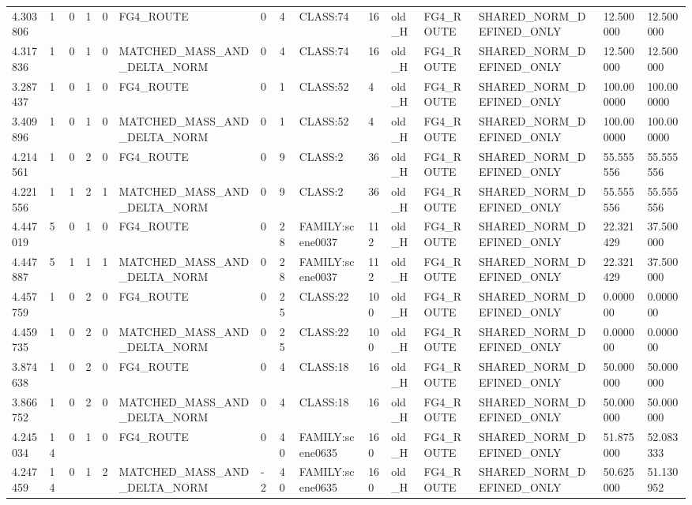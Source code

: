 \begin{tabular}{lllllllllllllll}
4.303806 & 1 & 0 & 1 & 0 & FG4\_ROUTE & 0 & 4 & CLASS:74 & 16 & old\_H & FG4\_ROUTE & SHARED\_NORM\_DEFINED\_ONLY & 12.500000 & 12.500000 \\
4.317836 & 1 & 0 & 1 & 0 & MATCHED\_MASS\_AND\_DELTA\_NORM & 0 & 4 & CLASS:74 & 16 & old\_H & FG4\_ROUTE & SHARED\_NORM\_DEFINED\_ONLY & 12.500000 & 12.500000 \\
3.287437 & 1 & 0 & 1 & 0 & FG4\_ROUTE & 0 & 1 & CLASS:52 & 4 & old\_H & FG4\_ROUTE & SHARED\_NORM\_DEFINED\_ONLY & 100.000000 & 100.000000 \\
3.409896 & 1 & 0 & 1 & 0 & MATCHED\_MASS\_AND\_DELTA\_NORM & 0 & 1 & CLASS:52 & 4 & old\_H & FG4\_ROUTE & SHARED\_NORM\_DEFINED\_ONLY & 100.000000 & 100.000000 \\
4.214561 & 1 & 0 & 2 & 0 & FG4\_ROUTE & 0 & 9 & CLASS:2 & 36 & old\_H & FG4\_ROUTE & SHARED\_NORM\_DEFINED\_ONLY & 55.555556 & 55.555556 \\
4.221556 & 1 & 1 & 2 & 1 & MATCHED\_MASS\_AND\_DELTA\_NORM & 0 & 9 & CLASS:2 & 36 & old\_H & FG4\_ROUTE & SHARED\_NORM\_DEFINED\_ONLY & 55.555556 & 55.555556 \\
4.447019 & 5 & 0 & 1 & 0 & FG4\_ROUTE & 0 & 28 & FAMILY:scene0037 & 112 & old\_H & FG4\_ROUTE & SHARED\_NORM\_DEFINED\_ONLY & 22.321429 & 37.500000 \\
4.447887 & 5 & 1 & 1 & 1 & MATCHED\_MASS\_AND\_DELTA\_NORM & 0 & 28 & FAMILY:scene0037 & 112 & old\_H & FG4\_ROUTE & SHARED\_NORM\_DEFINED\_ONLY & 22.321429 & 37.500000 \\
4.457759 & 1 & 0 & 2 & 0 & FG4\_ROUTE & 0 & 25 & CLASS:22 & 100 & old\_H & FG4\_ROUTE & SHARED\_NORM\_DEFINED\_ONLY & 0.000000 & 0.000000 \\
4.459735 & 1 & 0 & 2 & 0 & MATCHED\_MASS\_AND\_DELTA\_NORM & 0 & 25 & CLASS:22 & 100 & old\_H & FG4\_ROUTE & SHARED\_NORM\_DEFINED\_ONLY & 0.000000 & 0.000000 \\
3.874638 & 1 & 0 & 2 & 0 & FG4\_ROUTE & 0 & 4 & CLASS:18 & 16 & old\_H & FG4\_ROUTE & SHARED\_NORM\_DEFINED\_ONLY & 50.000000 & 50.000000 \\
3.866752 & 1 & 0 & 2 & 0 & MATCHED\_MASS\_AND\_DELTA\_NORM & 0 & 4 & CLASS:18 & 16 & old\_H & FG4\_ROUTE & SHARED\_NORM\_DEFINED\_ONLY & 50.000000 & 50.000000 \\
4.245034 & 14 & 0 & 1 & 0 & FG4\_ROUTE & 0 & 40 & FAMILY:scene0635 & 160 & old\_H & FG4\_ROUTE & SHARED\_NORM\_DEFINED\_ONLY & 51.875000 & 52.083333 \\
4.247459 & 14 & 0 & 1 & 2 & MATCHED\_MASS\_AND\_DELTA\_NORM & -2 & 40 & FAMILY:scene0635 & 160 & old\_H & FG4\_ROUTE & SHARED\_NORM\_DEFINED\_ONLY & 50.625000 & 51.130952 \\

\end{tabular}
